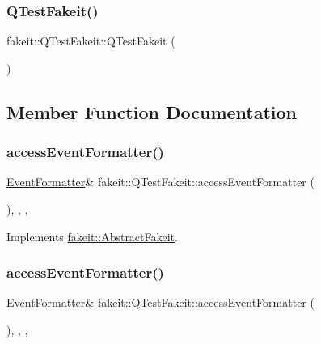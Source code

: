 \subsubsection{\texorpdfstring{QTestFakeit()}{QTestFakeit()}\hspace{0.1cm}{\footnotesize\ttfamily [2/2]}}
{\footnotesize\ttfamily fakeit\+::\+Q\+Test\+Fakeit\+::\+Q\+Test\+Fakeit (\begin{DoxyParamCaption}{ }\end{DoxyParamCaption})\hspace{0.3cm}{\ttfamily [inline]}}



\subsection{Member Function Documentation}
\mbox{\label{classfakeit_1_1QTestFakeit_a3760d57c61ed1572bcf5cded00f643ec}} 
\subsubsection{\texorpdfstring{accessEventFormatter()}{accessEventFormatter()}\hspace{0.1cm}{\footnotesize\ttfamily [1/2]}}
{\footnotesize\ttfamily \mbox{\hyperlink{structfakeit_1_1EventFormatter}{Event\+Formatter}}\& fakeit\+::\+Q\+Test\+Fakeit\+::access\+Event\+Formatter (\begin{DoxyParamCaption}{ }\end{DoxyParamCaption})\hspace{0.3cm}{\ttfamily [inline]}, {\ttfamily [override]}, {\ttfamily [protected]}, {\ttfamily [virtual]}}



Implements \mbox{\hyperlink{classfakeit_1_1AbstractFakeit_a443a7ac12208c55f2ae4fa072e983476}{fakeit\+::\+Abstract\+Fakeit}}.

\mbox{\label{classfakeit_1_1QTestFakeit_a3760d57c61ed1572bcf5cded00f643ec}} 
\subsubsection{\texorpdfstring{accessEventFormatter()}{accessEventFormatter()}\hspace{0.1cm}{\footnotesize\ttfamily [2/2]}}
{\footnotesize\ttfamily \mbox{\hyperlink{structfakeit_1_1EventFormatter}{Event\+Formatter}}\& fakeit\+::\+Q\+Test\+Fakeit\+::access\+Event\+Formatter (\begin{DoxyParamCaption}{ }\end{DoxyParamCaption})\hspace{0.3cm}{\ttfamily [inline]}, {\ttfamily [override]}, {\ttfamily [protected]}, {\ttfamily [virtual]}}



